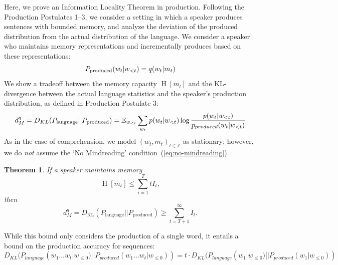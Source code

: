 \documentclass[11pt,letterpaper]{article}
\newcommand{\E}[0]{\mathbb{E}}
\newcounter{theorem}
\newtheorem{thm}[theorem]{Theorem}
\begin{document}
Here, we prove an Information Locality Theorem in production.
Following the Production Postulates 1--3, we consider a setting in which a speaker produces sentences with bounded memory, and analyze the deviation of the produced distribution from the actual distribution of the language.
We consider a speaker who maintains memory representations and incrementally produces based on these representations:
\begin{equation}
P_\text{produced}(w_t|w_{<t}) = q(w_t|m_t) \\
\end{equation}
We show a tradeoff between the memory capacity $\operatorname{H}[m_t]$ and the KL-divergence between the actual language statistics and the speaker's production distribution, as defined in Production Postulate 3:
\begin{equation}
d^q_M = D_{KL}(P_\text{language}||P_\text{produced})  = \E_{w_{<t}} \sum_{w_t} p(w_t|w_{<t}) \log \frac{p(w_t|w_{<t})}{p_{produced}(w_t|w_{<t})} \\
\end{equation}
As in the case of comprehension, we model $(w_t, m_t)_{t\in \mathbb{Z}}$ as stationary; however, we do \emph{not} assume the `No Mindreading' condition~(\ref{eq:no-mindreading}).

\begin{thm}
If a speaker maintains memory
	\begin{equation}
		\operatorname{H}[m_t] \leq \sum_{i=1}^T tI_t,
	\end{equation}
	then 
\begin{equation}
d^q_M = 	D_{\text{KL}}(P_\text{language}||P_\text{produced}) \geq \sum_{t=T+1}^\infty I_t.
\end{equation}
\end{thm}

While this bound only considers the production of a single word, it entails a bound on the production accuracy for sequences:
\begin{equation}
	D_{KL}(P_{language}(w_1\dots w_t|w_{\leq 0})||P_{produced}(w_1\dots w_t|w_{\leq 0}))  = t \cdot D_{KL}(P_{language}(w_1|w_{\leq 0})||P_{produced}(w_1|w_{\leq 0}))
\end{equation}
\end{document}
